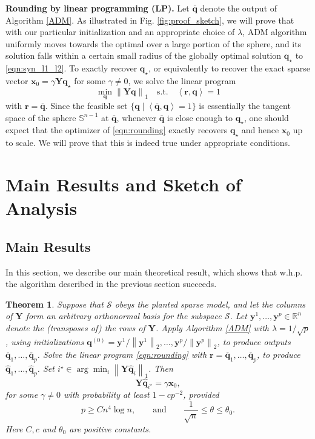 \documentclass[11pt, journal, final]{IEEEtran}
\numberwithin{equation}{section}
\newtheorem{theorem}{Theorem}[section]
\newcommand{\R}{\mathbb{R}}
\newcommand{\mb}{\mathbf}
\newcommand{\mc}{\mathcal}
\newcommand{\bb}{\mathbb}
\newcommand{\norm}[1]{\left\lVert#1\right\rVert}
\begin{document}
{\noindent\textbf{Rounding by linear programming (LP). }Let $\overline{\mb q}$ denote the output of Algorithm \ref{ADM}. As illustrated in Fig. \ref{fig:proof_sketch}, we will prove that with our particular initialization and an appropriate choice of $\lambda$, ADM algorithm uniformly moves towards the optimal over a large portion of the sphere, and its solution falls within a certain small radius of the globally optimal solution $\mb q_\star$ to \eqref{eqn:syn_l1_l2}. To exactly recover $\mb q_\star$, or equivalently to recover the exact sparse vector $\mb x_0 = \gamma \mb Y \mb q_\star$ for some $\gamma \neq 0$, we solve the linear program
\begin{equation} \label{eqn:rounding}
\min_{\mb q} \norm{\mb Y \mb q}_1 \quad \text{s.t.} \quad \left\langle \mb r, \mb q \right\rangle = 1
\end{equation}
with $\mb r = \overline{\mb q}$. Since the feasible set $\{\mb q \mid \left\langle \overline{\mb q}, \mb q \right\rangle = 1\}$ is essentially the tangent space of the sphere $\bb S^{n-1}$ at $\overline{\mb q}$, whenever $\overline{\mb q}$ is close enough to $\mb q_\star$, one should expect that the optimizer of \eqref{eqn:rounding} exactly recovers $\mb q_\star$ and hence $\mb x_0$ up to scale. We will prove that this is indeed true under appropriate conditions.

\section{Main Results and Sketch of Analysis}\label{sec:analysis}
\subsection{Main Results}

In this section, we describe our main theoretical result, which shows that w.h.p. the algorithm described in the previous section succeeds.

\begin{theorem} \label{thm:recovery}
Suppose that $\mc S$ obeys the planted sparse model, and let the columns of $\mb Y$ form an arbitrary orthonormal basis for the subspace $\mc S$. Let $\mb y^1, \dots, \mb y^p \in \R^n$ denote the (transposes of) the rows of $\mb Y$. Apply Algorithm \ref{ADM} with $\lambda = 1/\sqrt{p}$, using initializations $\mb q^{(0)} = \mb y^1/\norm{\mb y^1}_2 , \dots, \mb y^p / \norm{\mb y^p}_2$, to produce outputs $\overline{\mb q}_1, \dots, \overline{\mb q}_p$. Solve the linear program \eqref{eqn:rounding} with $\mb r = \overline{\mb q}_1, \dots, \overline{\mb q}_p$, to produce $\widehat{\mb q}_1, \dots, \widehat{\mb q}_p$. Set $i^\star \in \arg \min_i \norm{\mb Y \widehat{\mb q}_i}_1$. Then
\begin{equation}
\mb Y \widehat{\mb q}_{i^\star} = \gamma \mb x_0,
\end{equation}
for some $\gamma \ne 0$ with probability at least $1- cp^{-2}$, provided
\begin{equation}
p \ge Cn^4\log n, \qquad\text{and} \qquad  \frac{1}{\sqrt{n}} \le \theta\le \theta_0.
\end{equation}
Here $C, c$ and $\theta_0$ are positive constants.
\end{theorem}

}
\end{document}
